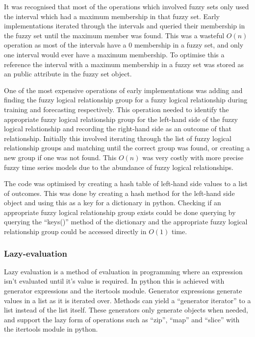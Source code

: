 \documentclass[12pt]{article}
\theoremstyle{definition}
\begin{document}
It was recognised that most of the operations which involved fuzzy sets only used the interval which had a maximum membership in that fuzzy set. Early implementations iterated through the intervals and queried their membership in the fuzzy set until the maximum member was found. This was a wasteful $O(n)$ operation as most of the intervals have a $0$ membership in a fuzzy set, and only one interval would ever have a maximum membership. To optimise this a reference the interval with a maximum membership in a fuzzy set was stored as an public attribute in the fuzzy set object.

One of the most expensive operations of early implementations was adding and finding the fuzzy logical relationship group for a fuzzy logical relationship during training and forecasting respectively. This operation needed to identify the appropriate fuzzy logical relationship group for the left-hand side of the fuzzy logical relationship and recording the right-hand side as an outcome of that relationship. Initially this involved iterating through the list of fuzzy logical relationship groups and matching until the correct group was found, or creating a new group if one was not found. This $O(n)$ was very costly with more precise fuzzy time series models due to the abundance of fuzzy logical relationships.

The code was optimised by creating a hash table of left-hand side values to a list of outcomes. This was done by creating a hash method for the left-hand side object and using this as a key for a dictionary in python. Checking if an appropriate fuzzy logical relationship group exists could be done querying by querying the ``keys()'' method of the dictionary and the appropriate fuzzy logical relationship group could be accessed directly in $O(1)$ time.

\subsubsection{Lazy-evaluation}

Lazy evaluation is a method of evaluation in programming where an expression isn't evaluated until it's value is required. In python this is achieved with generator expressions and the itertools module. Generator expressions generate values in a list as it is iterated over. Methods can yield a ``generator iterator'' to a list instead of the list itself. These generators only generate objects when needed, and support the lazy form of operations such as ``zip'', ``map'' and ``slice'' with the itertools module in python.
\end{document}

